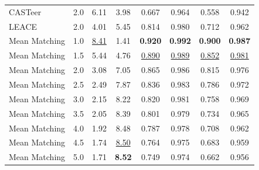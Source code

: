 \begin{table}[htbp]
\begin{tabular}{l|l|cccccc|}
CASTeer & 2.0 & 6.11 & 3.98 & 0.667 & 0.964 & 0.558 & 0.942 \\
LEACE & 2.0 & 4.01 & 5.45 & 0.814 & 0.980 & 0.712 & 0.962 \\
Mean Matching & 1.0 & \underline{8.41} & 1.41 & \textbf{0.920} & \textbf{0.992} & \textbf{0.900} & \textbf{0.987} \\
Mean Matching & 1.5 & 5.44 & 4.76 & \underline{0.890} & \underline{0.989} & \underline{0.852} & \underline{0.981} \\
Mean Matching & 2.0 & 3.08 & 7.05 & 0.865 & 0.986 & 0.815 & 0.976 \\
Mean Matching & 2.5 & 2.49 & 7.87 & 0.836 & 0.983 & 0.786 & 0.972 \\
Mean Matching & 3.0 & 2.15 & 8.22 & 0.820 & 0.981 & 0.758 & 0.969 \\
Mean Matching & 3.5 & 2.05 & 8.39 & 0.801 & 0.979 & 0.734 & 0.965 \\
Mean Matching & 4.0 & 1.92 & 8.48 & 0.787 & 0.978 & 0.708 & 0.962 \\
Mean Matching & 4.5 & 1.74 & \underline{8.50} & 0.764 & 0.975 & 0.683 & 0.959 \\
Mean Matching & 5.0 & 1.71 & \textbf{8.52} & 0.749 & 0.974 & 0.662 & 0.956 \\
\hline
\end{tabular}
\end{table}

